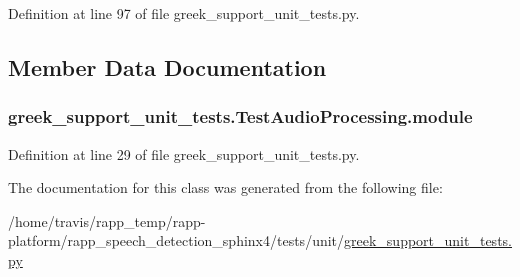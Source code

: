 Definition at line 97 of file greek\-\_\-support\-\_\-unit\-\_\-tests.\-py.



\subsection{Member Data Documentation}
\hypertarget{classgreek__support__unit__tests_1_1TestAudioProcessing_a82141fa5a1b98c4de7264f806c942fcd}{
\subsubsection[{module}]{\setlength{\rightskip}{0pt plus 5cm}greek\-\_\-support\-\_\-unit\-\_\-tests.\-Test\-Audio\-Processing.\-module}}\label{classgreek__support__unit__tests_1_1TestAudioProcessing_a82141fa5a1b98c4de7264f806c942fcd}


Definition at line 29 of file greek\-\_\-support\-\_\-unit\-\_\-tests.\-py.



The documentation for this class was generated from the following file\-:\begin{DoxyCompactItemize}
\item 
/home/travis/rapp\-\_\-temp/rapp-\/platform/rapp\-\_\-speech\-\_\-detection\-\_\-sphinx4/tests/unit/\hyperlink{greek__support__unit__tests_8py}{greek\-\_\-support\-\_\-unit\-\_\-tests.\-py}\end{DoxyCompactItemize}
